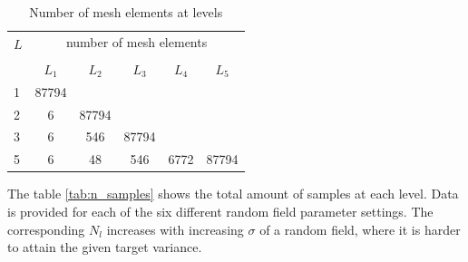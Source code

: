 \documentclass{article}
\begin{document}
\begin{table}[h]
    \centering
    \begin{tabular}{lccccc}
        \toprule
        \multirow{2}{*}{$L$} & \multicolumn{5}{c}{number of mesh elements} \\
        \cmidrule(lr){2-6}  \\
        {} & $L_1$ & $L_2$  & $L_3$ & $L_4$ &$L_5$ \\
        \midrule
        1 & 87794 &  &   &   &                	 \\
        2 & 6 & 87794   &    &  &             	 \\
        3 & 6 & 546 & 87794  &   &        		  \\
        5 & 6 & 48 & 546 &  6772 &  87794        \\
        
        \bottomrule
    \end{tabular}
    \caption{Number of mesh elements at levels}
       \label{tab:mesh_elements}
\end{table}

The table \ref{tab:n_samples} shows the total amount of samples at each level. Data is provided for each of the six different random field parameter settings. The corresponding $N_l$ increases with increasing $\sigma$ of a random field, where it is harder to attain the given target variance.
\end{document}
